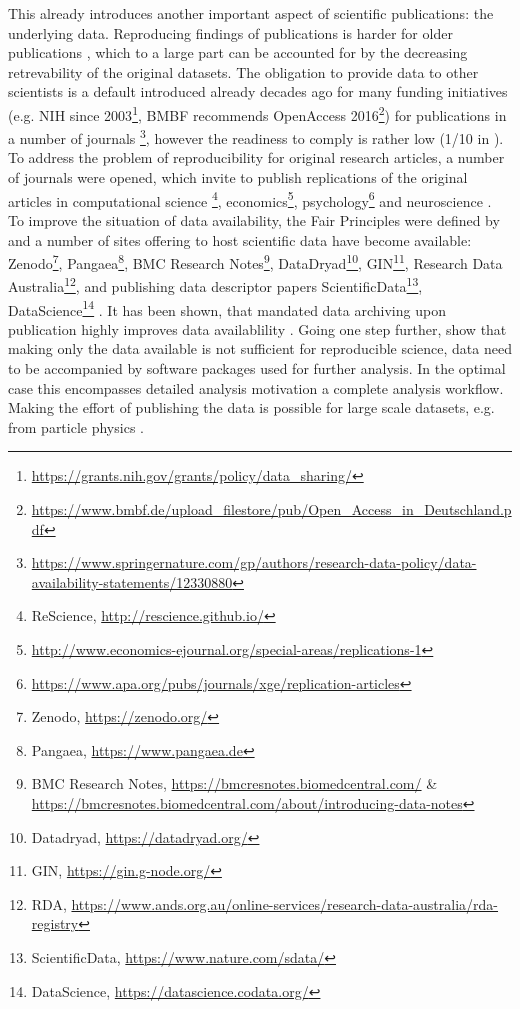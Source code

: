 This already introduces another important aspect of scientific publications: the underlying data. Reproducing findings of publications is harder for older publications \citep{Vines_2013}, which to a large part can be accounted for by the decreasing retrevability of the original datasets. The obligation to provide data to other scientists is a default introduced already decades ago for many funding initiatives (e.g. NIH since 2003\footnote{\url{https://grants.nih.gov/grants/policy/data_sharing/}}, BMBF recommends OpenAccess 2016\footnote{\url{https://www.bmbf.de/upload_filestore/pub/Open\_Access\_in\_Deutschland.pdf}}) for publications in a number of journals \footnote{\url{https://www.springernature.com/gp/authors/research-data-policy/data-availability-statements/12330880}}, however the readiness to comply is rather low (1/10 in \citep{Savage_2009}). To address the problem of reproducibility for original research articles, a number of journals were opened, which invite to publish replications of the original articles in computational science \footnote{ReScience, \url{http://rescience.github.io/}}, economics\footnote{\url{http://www.economics-ejournal.org/special-areas/replications-1}}, psychology\footnote{\url{https://www.apa.org/pubs/journals/xge/replication-articles}} and neuroscience \citep{Yeung_2017}.
To improve the situation of data availability, the Fair Principles were defined by \citep{Wilkinson_2016}   and a number of sites offering to host scientific data have become available: Zenodo\footnote{Zenodo, \url{https://zenodo.org/}}, Pangaea\footnote{Pangaea, \url{https://www.pangaea.de}}, BMC Research Notes\footnote{BMC Research Notes, \url{https://bmcresnotes.biomedcentral.com/} \& \url{https://bmcresnotes.biomedcentral.com/about/introducing-data-notes}}, DataDryad\footnote{Datadryad, \url{https://datadryad.org/}}, GIN\footnote{GIN, \url{https://gin.g-node.org/}}, Research Data Australia\footnote{RDA, \url{https://www.ands.org.au/online-services/research-data-australia/rda-registry}}, \citep{Assante_2016} and publishing data descriptor papers ScientificData\footnote{ScientificData, \url{https://www.nature.com/sdata/}}, DataScience\footnote{DataScience, \url{https://datascience.codata.org/}} \citep{Candela_2015}.
It has been shown, that mandated data archiving upon publication highly improves data availablility \citep{Vines_2013}. Going one step further, \citet{Chen_2019} show that making only the data available is not sufficient for reproducible science, data need to be accompanied by software packages used for further analysis. In the optimal case this encompasses detailed analysis motivation a complete analysis workflow. Making the effort of publishing the data is possible for large scale datasets, e.g. from particle physics \citep{Jomhari_2017}.

